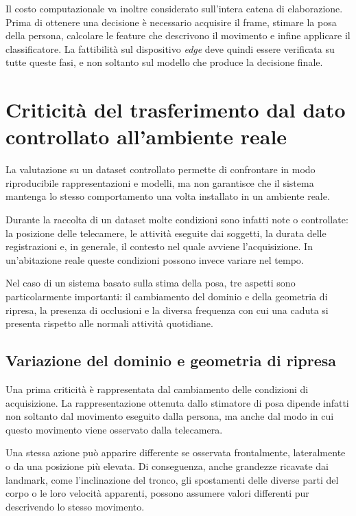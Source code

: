 Il costo computazionale va inoltre considerato sull'intera catena di
elaborazione. Prima di ottenere una decisione è necessario acquisire il
frame, stimare la posa della persona, calcolare le feature che descrivono il
movimento e infine applicare il classificatore. La fattibilità sul
dispositivo \emph{edge} deve quindi essere verificata su tutte queste fasi, e
non soltanto sul modello che produce la decisione finale.

\section{Criticità del trasferimento dal dato controllato all'ambiente reale}

La valutazione su un dataset controllato permette di confrontare in modo
riproducibile rappresentazioni e modelli, ma non garantisce che il sistema
mantenga lo stesso comportamento una volta installato in un ambiente reale.

Durante la raccolta di un dataset molte condizioni sono infatti note o
controllate: la posizione delle telecamere, le attività eseguite dai
soggetti, la durata delle registrazioni e, in generale, il contesto nel quale
avviene l'acquisizione. In un'abitazione reale queste condizioni possono
invece variare nel tempo.

Nel caso di un sistema basato sulla stima della posa, tre aspetti sono
particolarmente importanti: il cambiamento del dominio e della geometria di
ripresa, la presenza di occlusioni e la diversa frequenza con cui una caduta
si presenta rispetto alle normali attività quotidiane.

\subsection{Variazione del dominio e geometria di ripresa}

Una prima criticità è rappresentata dal cambiamento delle condizioni di
acquisizione. La rappresentazione ottenuta dallo stimatore di posa dipende
infatti non soltanto dal movimento eseguito dalla persona, ma anche dal modo
in cui questo movimento viene osservato dalla telecamera.

Una stessa azione può apparire differente se osservata frontalmente,
lateralmente o da una posizione più elevata. Di conseguenza, anche grandezze
ricavate dai landmark, come l'inclinazione del tronco, gli spostamenti delle
diverse parti del corpo o le loro velocità apparenti, possono assumere valori
differenti pur descrivendo lo stesso movimento.

